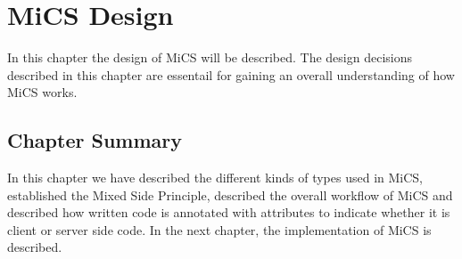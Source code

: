 \chapter{MiCS Design}

In this chapter the design of MiCS will be described. The design decisions described in this chapter are essentail for gaining an overall understanding of how MiCS works.











\section{Chapter Summary} %
\label{sec:chapter_design_summary}
In this chapter we have described the different kinds of types used in MiCS, established the Mixed Side Principle, described the overall workflow of MiCS and described how written code is annotated with attributes to indicate whether it is client or server side code. In the next chapter, the implementation of MiCS is described.
